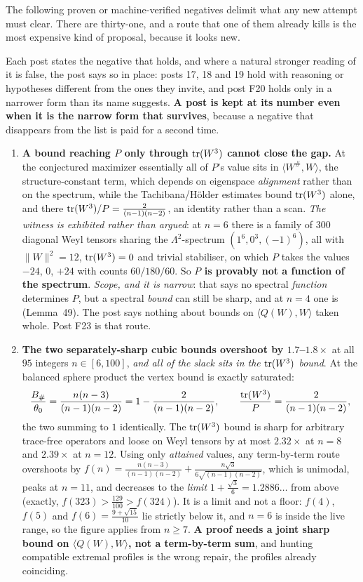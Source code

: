 \medskip
The following proven or machine-verified negatives delimit what any new attempt must clear. There are thirty-one, and a route that one of them already kills is the most expensive kind of proposal, because it looks new.

Each post states the negative that holds, and where a natural stronger reading of it is false, the post says so in place: posts 17, 18 and 19 hold with reasoning or hypotheses different from the ones they invite, and post F20 holds only in a narrower form than its name suggests. \textbf{A post is kept at its number even when it is the narrow form that survives}, because a negative that disappears from the list is paid for a second time.

\begin{enumerate}[leftmargin=1.8em]
\item \textbf{A bound reaching $P$ only through $\operatorname{tr}(W^3)$ cannot close the gap.} At the conjectured maximizer essentially all of $P$'s value sits in $\langle W^{\#},W\rangle$, the structure-constant term, which depends on eigenspace \emph{alignment} rather than on the spectrum, while the Tachibana/H\"older estimates bound $\operatorname{tr}(W^3)$ alone, and there $\operatorname{tr}(W^3)/P=\tfrac2{(n-1)(n-2)}$, an identity rather than a scan. \emph{The witness is exhibited rather than argued}: at $n=6$ there is a family of $300$ diagonal Weyl tensors sharing the $\Lambda^2$-spectrum $(1^6,0^3,(-1)^6)$, all with $\|W\|^2=12$, $\operatorname{tr}(W^3)=0$ and trivial stabiliser, on which $P$ takes the values $-24$, $0$, $+24$ with counts $60/180/60$. So \textbf{$P$ is provably not a function of the spectrum}. \emph{Scope, and it is narrow}: that says no spectral \emph{function} determines $P$, but a spectral \emph{bound} can still be sharp, and at $n=4$ one is (Lemma~49). The post says nothing about bounds on $\langle Q(W),W\rangle$ taken whole. Post F23 is that route.
\item \textbf{The two separately-sharp cubic bounds overshoot by $1.7$--$1.8\times$} at all $95$ integers $n\in[6,100]$, \emph{and all of the slack sits in the $\operatorname{tr}(W^3)$ bound}. At the balanced sphere product the vertex bound is exactly saturated:
\[
\frac{B_{\#}}{\theta_0}=\frac{n(n-3)}{(n-1)(n-2)}=1-\frac2{(n-1)(n-2)},\qquad \frac{\operatorname{tr}(W^3)}P=\frac2{(n-1)(n-2)},
\]
the two summing to $1$ identically. The $\operatorname{tr}(W^3)$ bound is sharp for arbitrary trace-free operators and loose on Weyl tensors by at most $2.32\times$ at $n=8$ and $2.39\times$ at $n=12$. Using only \emph{attained} values, any term-by-term route overshoots by $f(n)=\tfrac{n(n-3)}{(n-1)(n-2)}+\tfrac{n\sqrt3}{6\sqrt{(n-1)(n-2)}}$, which is unimodal, peaks at $n=11$, and decreases to the \emph{limit} $1+\tfrac{\sqrt3}6=1.2886\ldots$ from above (exactly, $f(323)>\tfrac{129}{100}>f(324)$). It is a limit and not a floor: $f(4)$, $f(5)$ and $f(6)=\tfrac{9+\sqrt{15}}{10}$ lie strictly below it, and $n=6$ is inside the live range, so the figure applies from $n\ge7$. \textbf{A proof needs a joint sharp bound on $\langle Q(W),W\rangle$, not a term-by-term sum}, and hunting compatible extremal profiles is the wrong repair, the profiles already coinciding.

\end{enumerate}
